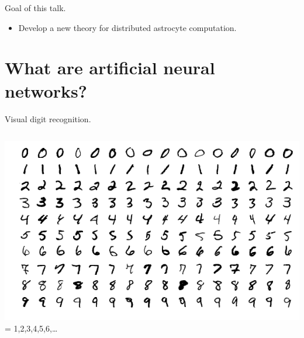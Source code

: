 \documentclass[10pt]{beamer}
\begin{document}
\begin{frame}[fragile]{Goal of this talk.}
\begin{itemize}
    \item Develop a new theory for distributed astrocyte computation.
\end{itemize}
\end{frame}


\section[Artificial neural networks.]{What are artificial neural networks?}

\begin{frame}[fragile]{Visual digit recognition.}
\begin{columns}
\centering
\includegraphics[scale=0.25]{images/minst.png}
\centering
 = 1,2,3,4,5,6,\ldots
\end{columns}
\end{frame}
\end{document}
